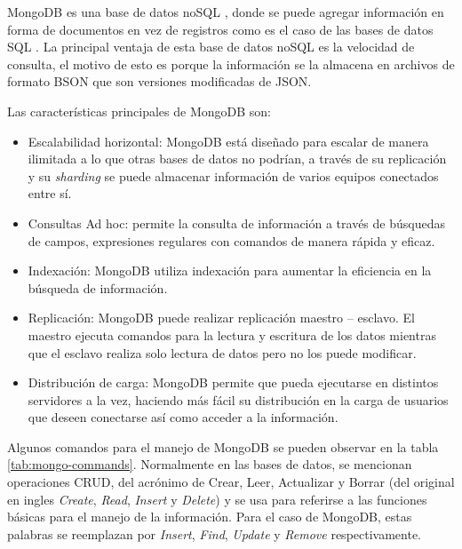 MongoDB es una base de datos noSQL \citep{WEBSITE:22},  donde se puede agregar información en forma de documentos en vez de registros como es el caso de las bases de datos SQL \citep{WEBSITE:23}.  La principal ventaja de esta base de datos noSQL es la velocidad de consulta, el motivo de esto es porque la información se la almacena en archivos de formato BSON que son versiones modificadas de JSON. 

Las características principales de MongoDB son:

\begin{itemize}
	\item Escalabilidad horizontal: MongoDB está diseñado para escalar de manera ilimitada a lo que otras bases de datos no podrían, a través de su replicación \citep{WEBSITE:24} y su \textit{sharding} \citep{WEBSITE:25} se puede almacenar información de varios equipos conectados entre sí.
	
	\item Consultas Ad hoc: permite la consulta de información a través de búsquedas de campos,
expresiones regulares con comandos de manera rápida y eficaz.

	\item Indexación: MongoDB utiliza indexación para aumentar la eficiencia en la búsqueda de
información.

	\item Replicación: MongoDB puede realizar replicación maestro – esclavo. El maestro ejecuta comandos para la lectura y escritura de los datos mientras que el esclavo realiza solo lectura de datos pero no los puede modificar.
	
	\item Distribución de carga: MongoDB permite que pueda ejecutarse en distintos servidores a la vez, haciendo más fácil su distribución en la carga de usuarios que deseen conectarse así como acceder a la información. 
	
\end{itemize}




Algunos comandos para el manejo de MongoDB se pueden observar en la tabla \ref{tab:mongo-commands}.  Normalmente en las bases de datos, se mencionan operaciones CRUD,  del acrónimo de Crear, Leer, Actualizar y Borrar (del original en ingles \textit{Create}, \textit{Read}, \textit{Insert} y \textit{Delete}) y se usa para referirse a las funciones básicas para el manejo de la información. Para el caso de MongoDB,  estas palabras se reemplazan por \textit{Insert}, \textit{Find}, \textit{Update} y \textit{Remove} respectivamente.


